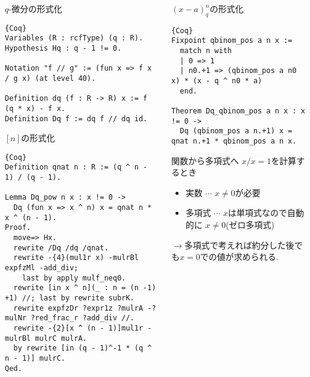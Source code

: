\documentclass[unicode,mathserif]{beamer}
\begin{document}
\begin{frame}[fragile]
\begin{columns}[T]
\begin{column}{0.33\columnwidth}
		\begin{block}{$q$-微分の形式化}
			\begin{lstlisting}{Coq}
Variables (R : rcfType) (q : R).
Hypothesis Hq : q - 1 != 0.

Notation "f // g" := (fun x => f x / g x) (at level 40).

Definition dq (f : R -> R) x := f (q * x) - f x.
Definition Dq f := dq f // dq id. \end{lstlisting}
		\end{block}
		
		\begin{block}{$[n]$の形式化}
			\begin{lstlisting}{Coq}
Definition qnat n : R := (q ^ n - 1) / (q - 1).

Lemma Dq_pow n x : x != 0 ->
  Dq (fun x => x ^ n) x = qnat n * x ^ (n - 1).
Proof.
  move=> Hx.
  rewrite /Dq /dq /qnat.
  rewrite -{4}(mul1r x) -mulrBl expfzMl -add_div;
    last by apply mulf_neq0.
  rewrite [in x ^ n](_ : n = (n -1) +1) //; last by rewrite subrK.
  rewrite expfzDr ?expr1z ?mulrA -?mulNr ?red_frac_r ?add_div //.
  rewrite -{2}[x ^ (n - 1)]mul1r -mulrBl mulrC mulrA.
  by rewrite [in (q - 1)^-1 * (q ^ n - 1)] mulrC.
Qed. \end{lstlisting}
		\end{block}
	\end{column}

	\begin{column}{0.33\columnwidth}
		\begin{block}{$(x - a)^n_q$の形式化}
			\begin{lstlisting}{Coq}
Fixpoint qbinom_pos a n x :=
  match n with
  | 0 => 1
  | n0.+1 => (qbinom_pos a n0 x) * (x - q ^ n0 * a)
  end. 
  
Theorem Dq_qbinom_pos a n x : x != 0 ->
  Dq (qbinom_pos a n.+1) x = qnat n.+1 * qbinom_pos a n x. \end{lstlisting}
		\end{block}

		\begin{block}{関数から多項式へ}
			$x / x = 1$を計算するとき
			\begin{itemize}
				\item 実数 $\cdots$ $x \ne 0$が必要
				\item 多項式 $\cdots$ $x$は単項式なので自動的に $x \ne 0$(ゼロ多項式)
			\end{itemize}
			$\to$多項式で考えれば約分した後でも$x = 0$での値が求められる.
		\end{block}


\end{column}
\end{columns}
\end{frame}
\end{document}
